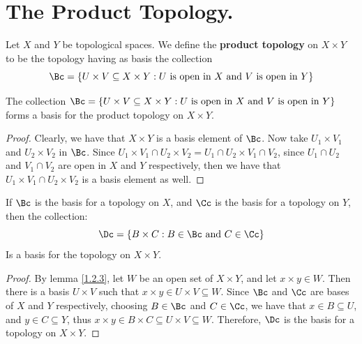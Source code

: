 
\section{The Product Topology.}

\begin{definition}
    Let $X$ and $Y$ be topological spaces. We define the \textbf{product topology} on
    $X \times Y$ to be the topology having as basis the collection
    \begin{equation*}
\Bc=\{U \times V \subseteq X \times Y:
    U \text{ is open in } X \text{ and } V \text{ is open in } Y\}
    \end{equation*}
\end{definition}

\begin{theorem}\label{1.4.1}
    The collection $\Bc=\{U \times V \subseteq X \times Y: U \text{ is open in } X \text{ and } V
    \text{ is open in } Y\}$ forms a basis for the product topology on $X \times Y$.
\end{theorem}
\begin{proof}
    Clearly, we have that $X \times Y$ is a basis element of  $\Bc$. Now take  $U_1 \times V_1$
    and $U_2 \times V_2$ in $\Bc$. Since  $U_1 \times V_1 \cap U_2 \times V_2=U_1 \cap U_2 \times V_1 \cap V_2$,
    since $U_1 \cap U_2$ and $V_1 \cap V_2$ are open in $X$ and  $Y$ respectively, then
    we have that $U_1 \times V_1 \cap U_2 \times V_2$ is a basis element as well.
\end{proof}

\begin{theorem}\label{1.4.2}
    If $\Bc$ is the basis for a topology on  $X$, and  $\Cc$ is the basis for a
    topology on  $Y$, then the collection:
        \begin{equation*}
            \Dc=\{B \times C: B \in \Bc \text{ and } C \in \Cc\}
        \end{equation*}
    Is a basis for the topology on $X \times Y$.
\end{theorem}
\begin{proof}
    By lemma \ref{1.2.3}, let $W$ be an open set of  $X \times Y$, and let  $x \times y \in W$.
    Then there is a basis  $U \times V$ such that  $x \times y \in U \times V \subseteq W$. Since  $\Bc$
    and  $\Cc$ are bases of  $X$ and  $Y$ respectively, choosing  $B \in \Bc$ and  $C \in \Cc$,
    we have that  $x \in B \subseteq U$, and  $y \in C \subseteq Y$, thus  $x \times y \in B \times C \subseteq U \times V \subseteq W$.
    Therefore, $\Dc$ is the basis for a topology on  $X \times Y$.
\end{proof}

